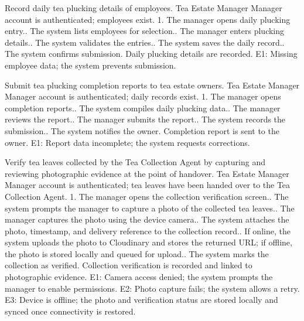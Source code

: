 {Record daily tea plucking details of employees.}
{Tea Estate Manager}
{Manager account is authenticated; employees exist.}
{1. The manager opens daily plucking entry.. The system lists employees for selection.. The manager enters plucking details.. The system validates the entries.. The system saves the daily record.. The system confirms submission.}
{Daily plucking details are recorded.}
{E1: Missing employee data; the system prevents submission.}

{Submit tea plucking completion reports to tea estate owners.}
{Tea Estate Manager}
{Manager account is authenticated; daily records exist.}
{1. The manager opens completion reports.. The system compiles daily plucking data.. The manager reviews the report.. The manager submits the report.. The system records the submission.. The system notifies the owner.}
{Completion report is sent to the owner.}
{E1: Report data incomplete; the system requests corrections.}

{Verify tea leaves collected by the Tea Collection Agent by capturing and reviewing photographic evidence at the point of handover.}
{Tea Estate Manager}
{Manager account is authenticated; tea leaves have been handed over to the Tea Collection Agent.}
{1. The manager opens the collection verification screen.. The system prompts the manager to capture a photo of the collected tea leaves.. The manager captures the photo using the device camera.. The system attaches the photo, timestamp, and delivery reference to the collection record.. If online, the system uploads the photo to Cloudinary and stores the returned URL; if offline, the photo is stored locally and queued for upload.. The system marks the collection as verified.}
{Collection verification is recorded and linked to photographic evidence.}
{E1: Camera access denied; the system prompts the manager to enable permissions.\newline
E2: Photo capture fails; the system allows a retry.\newline
E3: Device is offline; the photo and verification status are stored locally and synced once connectivity is restored.}

